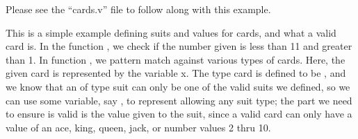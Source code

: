 
Please see the ``cards.v'' file to follow along with this example. 

\noindent
This is a simple example defining suits and values for cards, and what a valid card is. In the function , we check if the number given is less than 11 and greater than 1. In function , we pattern match against various types of cards. Here, the given card is represented by the variable x. The type card is defined to be , and we know that an  of type suit can only be one of the valid suits we defined, so we can use some variable, say , to represent allowing any suit type; the part we need to ensure is valid is the value given to the suit, since a valid card can only have a value of an ace, king, queen, jack, or number values 2 thru 10.

